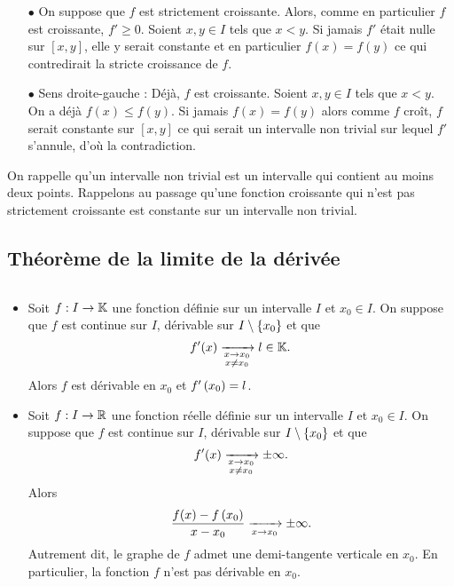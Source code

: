 \documentclass{magnoliaold}
\begin{document}
\begin{preuve}
\begin{itemize}
\item[$\bullet$] On suppose que $f$ est strictement croissante. Alors, comme en particulier $f$ est croissante, $f'\geq 0$. Soient $x,y \in I$ tels que $x<y$. Si jamais $f'$ était nulle sur $[x,y]$, elle y serait constante et en particulier $f(x)=f(y)$ ce qui contredirait la stricte croissance de $f$.
\item[$\bullet$] Sens droite-gauche : Déjà, $f$ est croissante. Soient $x,y \in I$ tels que $x<y$. On a déjà $f(x)\leq f(y)$. Si jamais $f(x)=f(y)$ alors comme $f$ croît, $f$ serait constante sur $[x,y]$ ce qui serait un intervalle non trivial sur lequel $f'$ s'annule, d'où la contradiction.
\end{itemize}

\end{preuve}

\begin{remarques}
\remarque On rappelle qu'un intervalle non trivial est un intervalle qui contient au moins deux points.
\remarque Rappelons au passage qu'une fonction croissante qui n'est pas
  strictement croissante est constante sur un intervalle non trivial.
\end{remarques}


\subsection{Théorème de la limite de la dérivée}

\begin{proposition}[utile=-3]
$\quad$
\begin{itemize}
\item Soit $f:I\to\mathbb{K}$ une fonction définie sur
  un intervalle $I$ et $x_0\in I$. On suppose que $f$ est continue sur $I$,
  dérivable sur $I\setminus\left\{x_0\right\}$ et que
  \[f'(x)\xrightarrow[ \substack{x\rightarrow x_0 \\ x\not=x_0}]{} l\in\mathbb{K}.\]
  Alors $f$ est dérivable en $x_0$ et $f'\left(x_0\right)=l$.
\item Soit $f:I\to\mathbb{R}$ une fonction réelle définie sur un intervalle
  $I$ et $x_0\in I$. On suppose que $f$ est continue sur $I$, dérivable sur
  $I\setminus\left\{x_0\right\}$
  et que
  \[f'(x)\xrightarrow[ \substack{x\rightarrow x_0 \\ x\not=x_0}]{} \pm\infty.\]
  Alors
  \[\frac{f(x)-f\left(x_0\right)}{x-x_0} \xrightarrow[x\rightarrow x_0]{} \pm\infty.\]
  Autrement dit, le graphe de $f$ admet une demi-tangente verticale en $x_0$.
  En particulier, la fonction $f$ n'est pas dérivable en $x_0$.
\end{itemize}
\end{proposition}
\end{document}
